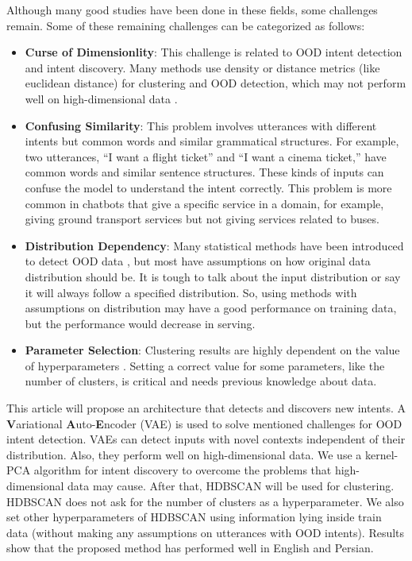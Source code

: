 \documentclass{article}
\begin{document}
Although many good studies have been done in these fields, some challenges remain.
Some of these remaining challenges can be categorized as follows:
\begin{itemize}
  \item \textbf{Curse of Dimensionlity}: This challenge is related to OOD intent detection and intent discovery. Many methods use density or distance metrics (like euclidean distance) for clustering and OOD detection, which may not perform well on high-dimensional data \citep{xia2015effectiveness}.
  \item \textbf{Confusing Similarity}: This problem involves utterances with different intents but common words and similar grammatical structures. For example, two utterances, “I want a flight ticket” and “I want a cinema ticket,” have common words and similar sentence structures. These kinds of inputs can confuse the model to understand the intent correctly. This problem is more common in chatbots that give a specific service in a domain, for example, giving ground transport services but not giving services related to buses.
  \item \textbf{Distribution Dependency}: Many statistical methods have been introduced to detect OOD data \citep{gen2021}, but most have assumptions on how original data distribution should be. It is tough to talk about the input distribution or say it will always follow a specified distribution. So, using methods with assumptions on distribution may have a good performance on training data, but the performance would decrease in serving.
  \item \textbf{Parameter Selection}: Clustering results are highly dependent on the value of hyperparameters \citep{fan2020hyperparameter}. Setting a correct value for some parameters, like the number of clusters, is critical and needs previous knowledge about data.
\end{itemize}
This article will propose an architecture that detects and discovers new intents.
A \textbf{V}ariational \textbf{A}uto-\textbf{E}ncoder (VAE) is used to solve mentioned challenges for OOD intent detection.
VAEs can detect inputs with novel contexts independent of their distribution.
Also, they perform well on high-dimensional data.
We use a kernel-PCA algorithm for intent discovery to overcome the problems that high-dimensional data may cause.
After that, HDBSCAN will be used for clustering.
HDBSCAN does not ask for the number of clusters as a hyperparameter.
We also set other hyperparameters of HDBSCAN using information lying inside train data (without making any assumptions on utterances with OOD intents).
Results show that the proposed method has performed well in English and Persian.
\end{document}
